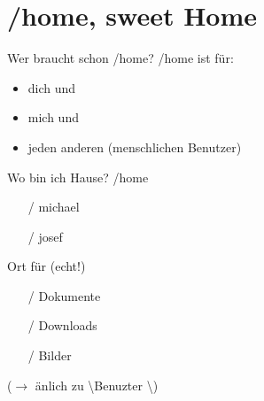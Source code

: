 \section[/home]{/home, sweet Home}
\begin{frame}{Wer braucht schon /home?}
/home ist für:
\begin{itemize}
 \item dich und
 \item mich und
 \item jeden anderen (menschlichen Benutzer)
\end{itemize}

\end{frame}

\begin{frame}{Wo bin ich Hause?}
/home
\begin{itemize}
  \item [/] michael
  \item [/] josef
\end{itemize}
\vfill
Ort für  {\small (echt!)}
\begin{itemize}
 \item [/] Dokumente
 \item [/] Downloads
 \item [/] Bilder
\end{itemize}
($\longrightarrow$ änlich zu \textbackslash Benuzter \textbackslash)

\vfill
\end{frame}